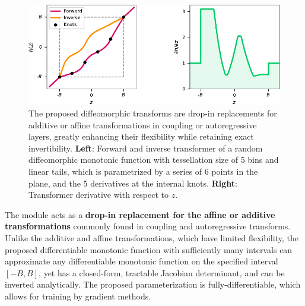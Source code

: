 \begin{figure}[!htb]
  \begin{center}
    \includegraphics[width=\linewidth]{figures/nf_simple3.pdf}
    \caption{The proposed diffeomorphic transforms are drop-in replacements for additive or affine transformations in coupling or autoregressive layers, greatly enhancing their flexibility while retaining exact invertibility. 
    \textbf{Left}: Forward and inverse transformer of a random diffeomorphic monotonic function with tessellation size of 5 bins and linear tails, which is parametrized by a series of 6 points in the plane, and the 5 derivatives at the internal knots. \textbf{Right}: Transformer derivative with respect to $z$. }
    \label{fig:nf_simple3}
  \end{center}
  \vspace{-0.5cm}
\end{figure}

The module acts as a \textbf{drop-in replacement for the affine or additive transformations} commonly found in coupling and autoregressive transforms. 
Unlike the additive and affine transformations, which have limited flexibility, the proposed differentiable monotonic function with sufficiently many intervals can approximate any differentiable monotonic function on the specified interval $[-B, B]$, yet has a closed-form, tractable Jacobian determinant, and can be inverted analytically. The proposed parameterization is fully-differentiable, which allows for training by gradient methods.

